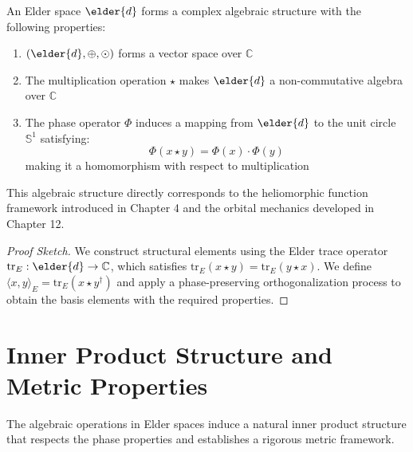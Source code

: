 
\begin{corollary}
An Elder space $\elder{d}$ forms a complex algebraic structure with the following properties:
\begin{enumerate}
    \item $(\elder{d}, \oplus, \odot)$ forms a vector space over $\mathbb{C}$
    \item The multiplication operation $\star$ makes $\elder{d}$ a non-commutative algebra over $\mathbb{C}$
    \item The phase operator $\Phi$ induces a mapping from $\elder{d}$ to the unit circle $\mathbb{S}^1$ satisfying:
    \begin{equation}
        \Phi(x \star y) = \Phi(x) \cdot \Phi(y)
    \end{equation}
    making it a homomorphism with respect to multiplication
\end{enumerate}
This algebraic structure directly corresponds to the heliomorphic function framework introduced in Chapter 4 and the orbital mechanics developed in Chapter 12.
\end{corollary}

\begin{proof}[Proof Sketch]
We construct structural elements using the Elder trace operator $\mathrm{tr}_E: \elder{d} \rightarrow \mathbb{C}$, which satisfies $\mathrm{tr}_E(x \star y) = \mathrm{tr}_E(y \star x)$. We define $\langle x, y \rangle_E = \mathrm{tr}_E(x \star y^{\dagger})$ and apply a phase-preserving orthogonalization process to obtain the basis elements with the required properties.
\end{proof}

\section{Inner Product Structure and Metric Properties}

The algebraic operations in Elder spaces induce a natural inner product structure that respects the phase properties and establishes a rigorous metric framework.

